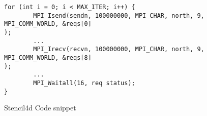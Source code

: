 \begin{comment}
starts running on a system. 
Even for some communications where the
destination is unknown such as the Lagos shown in
Figure \ref{code.laghos}. The API can be used to indicate that the unknown destination flow is
an elephant flow as long as the user can determine that the message size of the
communication is sufficiently large.
To identify an elephant flow, the information about the message size of the
flow is needed. Therefore, in this project application is run initially with a certain node to rank mapping, and the
amount of data sent in each flow is collected. This data is stored in a matrix and then a program is used to filter
flows which send more than a certain threshold of data across the entire simulation. 
These entire program is packaged in an API which classifies the flows as elephant flows. 
This API, gurantees that the user has ground truth about
the communication which happens in a network when a specific set of HPC applications are run on that 
system.
\end{comment}

\begin{figure}[hbtp]
\caption{Stencil4d Code snippet}
\label{code.stencil}
\begin{lstlisting}[breaklines]
for (int i = 0; i < MAX_ITER; i++) {
        MPI_Isend(sendn, 100000000, MPI_CHAR, north, 9, MPI_COMM_WORLD, &reqs[0]
);
        ...
        MPI_Irecv(recvn, 100000000, MPI_CHAR, north, 9, MPI_COMM_WORLD, &reqs[8]
);
        ...
        MPI_Waitall(16, req status);
}
\end{lstlisting}
\end{figure}


\begin{comment}
\begin{figure}[hbtp]
\caption{Laghos Code snippet}
\label{code.laghos}
\begin{lstlisting}[breaklines]
LagrangianHydroOperator (...){
        ...
        ParMesh *pm = H1FESpace.GetParMesh();
        MPI_Allreduce(&loc_area, &glob_area, 1, MPI_DOUBLE, MPI_SUM, pm->GetComm
());
        ...
}
\end{lstlisting}
\end{figure}
\end{comment}

